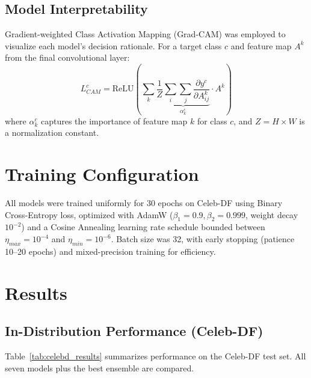 \documentclass[runningheads]{llncs}
\begin{document}
\subsection{Model Interpretability}
Gradient-weighted Class Activation Mapping (Grad-CAM) was employed to visualize each model's decision rationale. For a target class $c$ and feature map $A^k$ from the final convolutional layer:
\begin{equation}
    L_{CAM}^c = \text{ReLU}\left(\sum_k \underbrace{\frac{1}{Z} \sum_i \sum_j \frac{\partial y^c}{\partial A_{ij}^k}}_{\alpha_k^c} \cdot A^k \right)
\end{equation}
where $\alpha_k^c$ captures the importance of feature map $k$ for class $c$, and $Z = H \times W$ is a normalization constant.

\section{Training Configuration}
All models were trained uniformly for 30 epochs on Celeb-DF using Binary Cross-Entropy loss, optimized with AdamW ($\beta_1{=}0.9, \beta_2{=}0.999$, weight decay $10^{-2}$) and a Cosine Annealing learning rate schedule bounded between $\eta_{max}{=}10^{-4}$ and $\eta_{min}{=}10^{-6}$. Batch size was 32, with early stopping (patience 10--20 epochs) and mixed-precision training for efficiency.

\section{Results}

\subsection{In-Distribution Performance (Celeb-DF)}
Table~\ref{tab:celebd_results} summarizes performance on the Celeb-DF test set. All seven models plus the best ensemble are compared.
\end{document}
